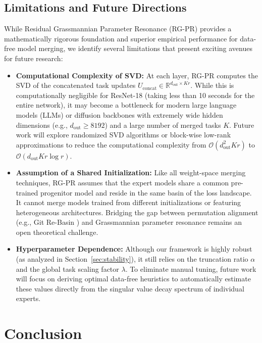 \documentclass{article}
\theoremstyle{plain}
\theoremstyle{definition}
\theoremstyle{remark}
\begin{document}
\subsection{Limitations and Future Directions}
While Residual Grassmannian Parameter Resonance (RG-PR) provides a mathematically rigorous foundation and superior empirical performance for data-free model merging, we identify several limitations that present exciting avenues for future research:
\begin{itemize}
    \item \textbf{Computational Complexity of SVD:} At each layer, RG-PR computes the SVD of the concatenated task updates $U_{\text{concat}} \in \mathbb{R}^{d_{\text{out}} \times Kr}$. While this is computationally negligible for ResNet-18 (taking less than 10 seconds for the entire network), it may become a bottleneck for modern large language models (LLMs) or diffusion backbones with extremely wide hidden dimensions (e.g., $d_{\text{out}} \ge 8192$) and a large number of merged tasks $K$. Future work will explore randomized SVD algorithms \citep{halko2011finding} or block-wise low-rank approximations to reduce the computational complexity from $\mathcal{O}(d_{\text{out}}^2 Kr)$ to $\mathcal{O}(d_{\text{out}} Kr \log r)$.
    \item \textbf{Assumption of a Shared Initialization:} Like all weight-space merging techniques, RG-PR assumes that the expert models share a common pre-trained progenitor model and reside in the same basin of the loss landscape. It cannot merge models trained from different initializations or featuring heterogeneous architectures. Bridging the gap between permutation alignment (e.g., Git Re-Basin \citep{ainsworth2023git}) and Grassmannian parameter resonance remains an open theoretical challenge.
    \item \textbf{Hyperparameter Dependence:} Although our framework is highly robust (as analyzed in Section~\ref{sec:stability}), it still relies on the truncation ratio $\alpha$ and the global task scaling factor $\lambda$. To eliminate manual tuning, future work will focus on deriving optimal data-free heuristics to automatically estimate these values directly from the singular value decay spectrum of individual experts.
\end{itemize}

\section{Conclusion}
\label{sec:conclusion}
\end{document}

